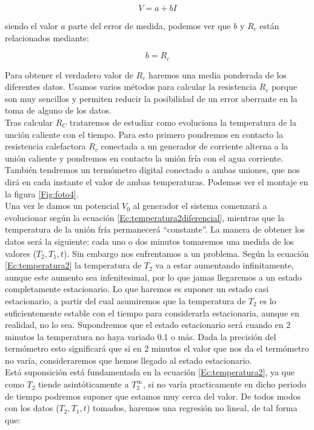 \documentclass[12pt,a4paper]{article}
\begin{document}
\begin{equation}
V = a + b I 
\end{equation}

siendo el valor $a$ parte del error de medida, podemos ver que $b$ y $R_c$ están relacionados mediante:

\begin{equation}
b = R_c
\end{equation}

Para obtener el verdadero valor de $R_c$ haremos una media ponderada de los diferentes datos. Usamos varios métodos para calcular la resistencia $R_c$ porque son muy sencillos y permiten reducir la posibilidad de un error aberrante en la toma de alguno de los datos. \\


Tras calcular $R_C$ trataremos de estudiar como evoluciona la temperatura de la unción caliente con el tiempo. Para esto primero pondremos en contacto la resistencia calefactora $R_c$ conectada a un generador de corriente alterna a la unión caliente y pondremos en contacto la unión fría con el agua corriente. También tendremos un termómetro digital conectado a ambas uniones, que nos dirá en cada instante el valor de ambas temperaturas. Podemos ver el montaje en la figura \ref{Fig:foto4}. \\


Una vez le damos un potencial $V_0$ al generador el sistema comenzará a evolucionar según la ecuación \ref{Ec:temperatura2diferencial}, mientras que la temperatura de la unión fría permanecerá ``constante''. La manera de obtener los datos será la siguiente: cada uno o dos minutos tomaremos una medida de los valores ($T_2, T_1, t$). Sin embargo nos enfrentamos a un problema. Según la ecuación \ref{Ec:temperatura2} la temperatura de $T_2$ va a estar aumentando infinitamente, aunque este aumento sea infenitesimal, por lo que jamas llegaremos a un estado completamente estacionario. Lo que haremos es suponer un estado casi estacionario, a partir del cual asumiremos que la temperatura de $T_2$ es lo suficientemente estable con el tiempo para considerarla estacionaria, aunque en realidad, no lo sea. Supondremos que el estado estacionario será cuando en 2 minutos la temperatura no haya variado 0.1 o más. Dada la precisión del termómetro esto significará que si en 2 minutos el valor que nos da el termómetro no varía, consideraremos que hemos llegado al estado estacionario. \\
 
Está suponsición está fundamentada en la ecuación \ref{Ec:temperatura2}, ya que como $T_2$ tiende asintóticamente a $T_2^{\infty}$, si no varía practicamente en dicho periodo de tiempo podremos suponer que estamos muy cerca del valor. De todos modos con los datos ($T_2, T_1, t$) tomados, haremos una regresión no lineal, de tal forma que:
\end{document}
